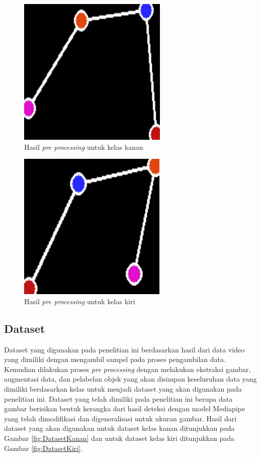 \begin{figure}[H]
  \centering
  \includegraphics[scale=0.8]{gambar/dataset kanan.png}
  \caption{Hasil \emph{pre processing} untuk kelas kanan}
  \label{fig:KelasKanan}
\end{figure}

\begin{figure}[H]
  \centering
  \includegraphics[scale=0.8]{gambar/dataset kiri.png}
  \caption{Hasil \emph{pre processing} untuk kelas kiri}
  \label{fig:KelasKiri}
\end{figure}


\subsection{Dataset}
\label{subsec:Dataset}

Dataset yang digunakan pada penelitian ini berdasarkan hasil dari data video yang dimiliki dengan mengambil sampel pada proses pengambilan data. Kemudian dilakukan proses \emph{pre processing} dengan melakukan ekstraksi gambar, augmentasi data, dan pelabelan objek yang akan disimpan keseluruhan data yang dimiliki berdasarkan kelas untuk menjadi dataset yang akan digunakan pada penelitian ini. Dataset yang telah dimiliki pada penelitian ini berupa data gambar berisikan bentuk kerangka dari hasil deteksi dengan model Mediapipe yang telah dimodifikasi dan digeneralisasi untuk ukuran gambar. Hasil dari dataset yang akan digunakan untuk dataset kelas kanan ditunjukkan pada Gambar \ref{fig:DatasetKanan} dan untuk dataset kelas kiri ditunjukkan pada Gambar \ref{fig:DatasetKiri}.

